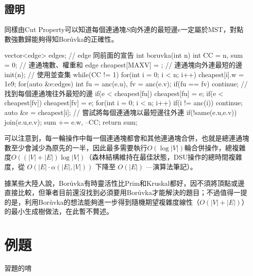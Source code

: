 \documentclass[main.tex]{subfiles}
\begin{document}
\subsection{證明}
同樣由Cut Property可以知道每個連通塊$S$向外連的最短邊$e$一定屬於MST，對點數強數歸能夠得知Borůvka的正確性。
\begin{C++}
vector<edge> edges; // edge 同前面的宣告
int boruvka(int n){
    int CC = n, sum = 0; // 連通塊數、權重和
    edge cheapest[MAXV] = {}; // 連通塊向外連最短的邊
    init(n); // 使用並查集
    while(CC != 1){
        for(int i = 0; i < n; i++) cheapest[i].w = 1e9;
        for(auto &e:edges){
            int fu = anc(e.u), fv = anc(e.v);
            if(fu == fv) continue;
            // 找到每個連通塊往外最短的邊
            if(e < cheapest[fu]) cheapest[fu] = e;
            if(e < cheapest[fv]) cheapest[fv] = e;	
        }
        for(int i = 0; i < n; i++) {
            if(i != anc(i)) continue;
            auto &e = cheapest[i];
            // 嘗試將每個連通塊以最短邊往外連
            if(!same(e.u,e.v)) {
                join(e.u,e.v);
                sum += e.w, --CC;
            }
        }
    }
    return sum;
}
\end{C++}

可以注意到，每一輪操作中每一個連通塊都會和其他連通塊合併，也就是總連通塊數至少會減少為原先的一半，因此最多需要執行$O(\log|V|)$輪合併操作，總複雜度$O((|V|+|E|)\log|V|)$（森林結構維持在最佳狀態，DSU操作的總時間複雜度，從 $O(|E|\cdot\alpha(|E|,|V|))$ 下降至 $O(|E|)$ —演算法筆記）。

據某些大陸人說，Borůvka有時靈活性比Prim和Kruskal都好，因不須將頂點或邊直接比較，但筆者目前還沒找到必須要用Borůvka才能解決的題目；不過值得一提的是，利用Borůvka的想法能夠進一步得到隨機期望複雜度線性（$O(|V|+|E|)$）的最小生成樹做法，在此暫不贅述。

\section{例題}
習題的唷
\end{document}
